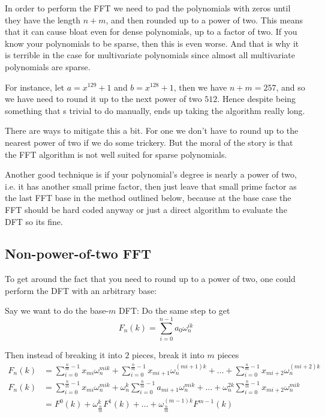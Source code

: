 \begin{remark}
    In order to perform the FFT we need to pad the polynomials with zeros until they have the length $n + m$, and then rounded up to a power of two. This means that it can cause bloat even for dense polynomials, up to a factor of two. If you know your polynomials to be sparse, then this is even worse. And that is why it is terrible in the case for multivariate polynomials since almost all multivariate polynomials are sparse.

    For instance, let $a = x^{129} + 1$ and $b = x^{128} + 1$, then we have $n + m = 257$, and so we have need to round it up to the next power of two $512$. Hence despite being something that s trivial to do manually, ends up taking the algorithm really long.

    There are ways to mitigate this a bit. For one we don't have to round up to the nearest power of two if we do some trickery. But the moral of the story is that the FFT algorithm is not well suited for sparse polynomials.

    Another good technique is if your polynomial's degree is nearly a power of two, i.e. it has another small prime factor, then just leave that small prime factor as the last FFT base in the method outlined below, because at the base case the FFT should be hard coded anyway or just a direct algorithm to evaluate the DFT so its fine.
\end{remark}

\subsection{Non-power-of-two FFT}

To get around the fact that you need to round up to a power of two, one could perform the DFT with an arbitrary base:

Say we want to do the base-$m$ DFT:
Do the same step to get
\[
    F_n(k) = \sum^{n-1}_{i=0} a_0\omega_n^{ik} 
\]

Then instead of breaking it into $2$ pieces, break it into $m$ pieces
\begin{align*}
    F_n(k) &= \sum^{\frac{n}{m}-1}_{i=0} x_{mi}\omega_n^{mik} + \sum^{\frac{n}{m}-1}_{i=0} x_{mi+1}\omega_n^{(mi+1)k} + \ldots + \sum^{\frac{n}{m}-1}_{i=0} x_{mi+2}\omega_n^{(mi+2)k}\\
    F_n(k) &= \sum^{\frac{n}{m}-1}_{i=0} x_{mi}\omega_n^{mik} + \omega_n^k\sum^{\frac{n}{m}-1}_{i=0} a_{mi+1}\omega_n^{mik} + \ldots +  \omega_n^{2k}\sum^{\frac{n}{m}-1}_{i=0} x_{mi+2}\omega_n^{mik}\\
    &= F^0(k) + \omega_{\frac{n}{m}}^k F^1(k) + \ldots + \omega_{\frac{n}{m}}^{(m-1)k} F^{m-1}(k)
\end{align*}

